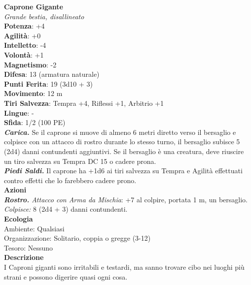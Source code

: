\begin{multicols}{2}
\medskip\textbf{Caprone Gigante}\\
\emph{Grande bestia, disallineato}\\
\textbf{Potenza}: +4\\
\textbf{Agilità}: +0\\
\textbf{Intelletto}: -4\\
\textbf{Volontà}: +1\\
\textbf{Magnetismo}: -2\\
\textbf{Difesa}: 13 (armatura naturale)\\
\textbf{Punti Ferita}: 19 (3d10 + 3)\\
\textbf{Movimento}: 12 m\\
\textbf{Tiri Salvezza}: Tempra +4, Riflessi +1, Arbitrio +1 \\
\textbf{Lingue}: -\\
\textbf{Sfida}: 1/2 (100 PE)\smallskip\\
\emph{\textbf{Carica.}} Se il caprone si muove di almeno 6 metri diretto verso il bersaglio e colpisce con un attacco di rostro durante lo stesso turno, il bersaglio subisce 5 (2d4) danni contundenti aggiuntivi. Se il bersaglio è una creatura, deve riuscire un tiro salvezza su Tempra DC  15 o cadere prona.\\
\emph{\textbf{Piedi Saldi.}} Il caprone ha +1d6 ai tiri salvezza su Tempra e Agilità effettuati contro effetti che lo farebbero cadere prono.\\
\smallskip\textbf{Azioni}\\
\emph{\textbf{Rostro.} Attacco con Arma da Mischia}: +7 al colpire, portata 1 m, un bersaglio.\\
\emph{Colpisce:} 8 (2d4 + 3) danni contundenti.\\
\textbf{Ecologia}\\
Ambiente: Qualsiasi\\
Organizzazione: Solitario, coppia o gregge (3-12)\\
Tesoro: Nessuno\\
\textbf{Descrizione}\\
I Caproni giganti sono irritabili e testardi, ma sanno trovare cibo nei luoghi più strani e possono digerire quasi ogni cosa. \\


\end{multicols}
